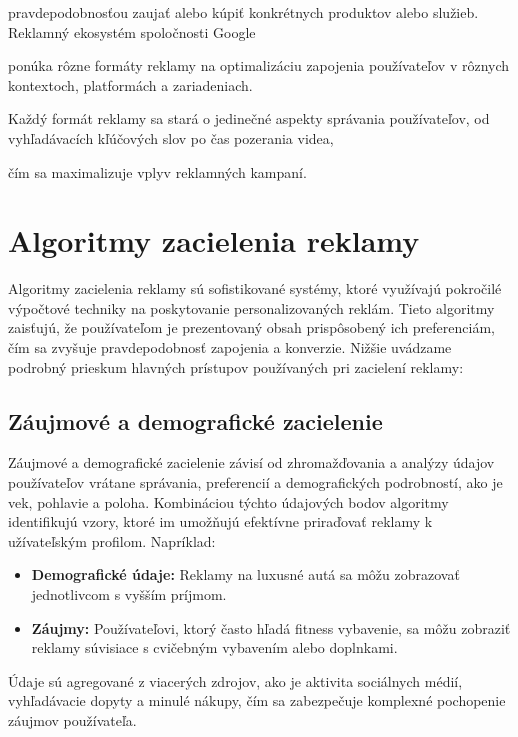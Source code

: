 \documentclass[10pt,slovak,a4paper]{article}
\begin{document}
pravdepodobnosťou zaujať alebo kúpiť konkrétnych produktov alebo služieb. Reklamný ekosystém spoločnosti Google  

ponúka rôzne formáty reklamy na optimalizáciu zapojenia používateľov v rôznych kontextoch, platformách a zariadeniach.  

Každý formát reklamy sa stará o jedinečné aspekty správania používateľov, od vyhľadávacích kľúčových slov po čas pozerania videa,  

čím sa maximalizuje vplyv reklamných kampaní. 



\section{Algoritmy zacielenia reklamy}

Algoritmy zacielenia reklamy sú sofistikované systémy, ktoré využívajú pokročilé výpočtové techniky na poskytovanie personalizovaných reklám. Tieto algoritmy zaisťujú, že používateľom je prezentovaný obsah prispôsobený ich preferenciám, čím sa zvyšuje pravdepodobnosť zapojenia a konverzie. Nižšie uvádzame podrobný prieskum hlavných prístupov používaných pri zacielení reklamy:




\subsection{Záujmové a demografické zacielenie}
Záujmové a demografické zacielenie závisí od zhromažďovania a analýzy údajov používateľov vrátane správania, preferencií a demografických podrobností, ako je vek, pohlavie a poloha. Kombináciou týchto údajových bodov algoritmy identifikujú vzory, ktoré im umožňujú efektívne priraďovať reklamy k užívateľským profilom. Napríklad:
\begin{itemize}
    \item \textbf{Demografické údaje:} Reklamy na luxusné autá sa môžu zobrazovať jednotlivcom s vyšším príjmom.
    \item \textbf{Záujmy:} Používateľovi, ktorý často hľadá fitness vybavenie, sa môžu zobraziť reklamy súvisiace s cvičebným vybavením alebo doplnkami.
\end{itemize}
Údaje sú agregované z viacerých zdrojov, ako je aktivita sociálnych médií, vyhľadávacie dopyty a minulé nákupy, čím sa zabezpečuje komplexné pochopenie záujmov používateľa.
\end{document}

